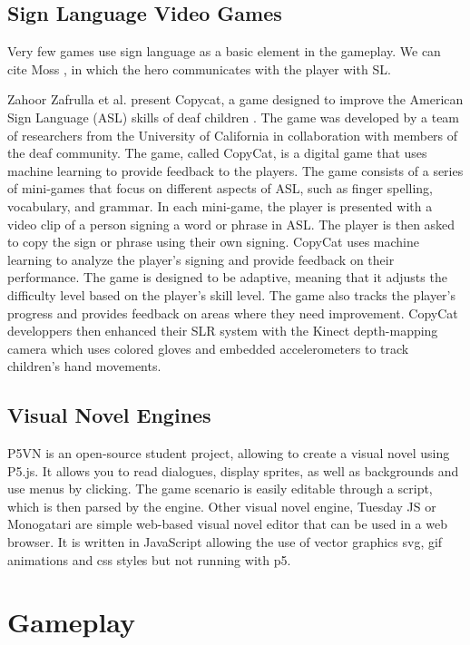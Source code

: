 
\subsection{Sign Language Video Games}

Very few games use sign language as a basic element in the gameplay. We can cite Moss \cite{moss2018}, in which the hero communicates with the player with SL. 

Zahoor Zafrulla et al. present Copycat, a game designed to improve the American Sign Language (ASL) skills of deaf children \cite{zafrulla2011copycat}. The game was developed by a team of researchers from the University of California in collaboration with members of the deaf community.
The game, called CopyCat, is a digital game that uses machine learning to provide feedback to the players. The game consists of a series of mini-games that focus on different aspects of ASL, such as finger spelling, vocabulary, and grammar. In each mini-game, the player is presented with a video clip of a person signing a word or phrase in ASL. The player is then asked to copy the sign or phrase using their own signing.
CopyCat uses machine learning to analyze the player's signing and provide feedback on their performance. The game is designed to be adaptive, meaning that it adjusts the difficulty level based on the player's skill level. The game also tracks the player's progress and provides feedback on areas where they need improvement.
CopyCat developpers then enhanced their SLR system with the Kinect depth-mapping camera which uses colored gloves and embedded accelerometers to track children's hand movements.

\subsection{Visual Novel Engines}

P5VN is an open-source student project, allowing to create a visual novel using P5.js. It allows you to read dialogues, display sprites, as well as backgrounds and use menus by clicking. The game scenario is easily editable through a script, which is then parsed by the engine.
Other visual novel engine, Tuesday JS or Monogatari are simple web-based visual novel editor that can be used in a web browser. It is written in JavaScript allowing the use of vector graphics svg, gif animations and css styles but not running with p5.

\section{Gameplay}

